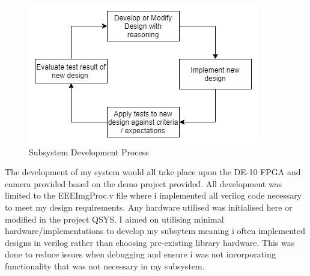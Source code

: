 \documentclass[10pt,twoside]{article}
\begin{document}
\begin{figure}[hbt!]
    \centering
    \includegraphics[scale=0.60]{FlowOfDesign.jpg}
    \captionsetup{justification=centering}
    \caption{Subsystem Development Process}
\end{figure}

The development of my system would all take place upon the DE-10 FPGA and camera provided based on the demo project provided. All development was limited to the EEEImgProc.v file where i implemented all verilog code necessary to meet my design requirements. Any hardware utilised was initialised here or modified in the project QSYS. I aimed on utilising minimal hardware/implementations to develop  my subsytem meaning i often implemented designs in verilog rather than choosing pre-existing library hardware. This was done to reduce issues when debugging and ensure i was not incorporating functionality that was not necessary in my subsystem.




\newpage
\end{document}
